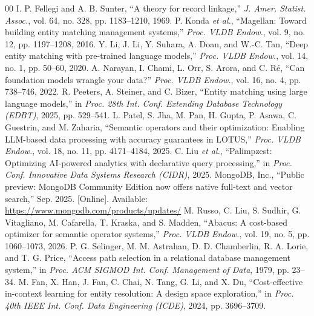 \documentclass[conference]{IEEEtran}
\begin{document}
\begin{thebibliography}{00}
 I. P. Fellegi and A. B. Sunter, ``A theory for record linkage,'' \textit{J. Amer. Statist. Assoc.}, vol. 64, no. 328, pp. 1183--1210, 1969.
 P. Konda \textit{et al.}, ``Magellan: Toward building entity matching management systems,'' \textit{Proc. VLDB Endow.}, vol. 9, no. 12, pp. 1197--1208, 2016.
 Y. Li, J. Li, Y. Suhara, A. Doan, and W.-C. Tan, ``Deep entity matching with pre-trained language models,'' \textit{Proc. VLDB Endow.}, vol. 14, no. 1, pp. 50--60, 2020.
 A. Narayan, I. Chami, L. Orr, S. Arora, and C. R\'e, ``Can foundation models wrangle your data?'' \textit{Proc. VLDB Endow.}, vol. 16, no. 4, pp. 738--746, 2022.
 R. Peeters, A. Steiner, and C. Bizer, ``Entity matching using large language models,'' in \textit{Proc. 28th Int. Conf. Extending Database Technology (EDBT)}, 2025, pp. 529--541.
 L. Patel, S. Jha, M. Pan, H. Gupta, P. Asawa, C. Guestrin, and M. Zaharia, ``Semantic operators and their optimization: Enabling LLM-based data processing with accuracy guarantees in LOTUS,'' \textit{Proc. VLDB Endow.}, vol. 18, no. 11, pp. 4171--4184, 2025.
 C. Liu \textit{et al.}, ``Palimpzest: Optimizing AI-powered analytics with declarative query processing,'' in \textit{Proc. Conf. Innovative Data Systems Research (CIDR)}, 2025.
 MongoDB, Inc., ``Public preview: MongoDB Community Edition now offers native full-text and vector search,'' Sep. 2025. [Online]. Available: \url{https://www.mongodb.com/products/updates/}
 M. Russo, C. Liu, S. Sudhir, G. Vitagliano, M. Cafarella, T. Kraska, and S. Madden, ``Abacus: A cost-based optimizer for semantic operator systems,'' \textit{Proc. VLDB Endow.}, vol. 19, no. 5, pp. 1060--1073, 2026.
 P. G. Selinger, M. M. Astrahan, D. D. Chamberlin, R. A. Lorie, and T. G. Price, ``Access path selection in a relational database management system,'' in \textit{Proc. ACM SIGMOD Int. Conf. Management of Data}, 1979, pp. 23--34.
 M. Fan, X. Han, J. Fan, C. Chai, N. Tang, G. Li, and X. Du, ``Cost-effective in-context learning for entity resolution: A design space exploration,'' in \textit{Proc. 40th IEEE Int. Conf. Data Engineering (ICDE)}, 2024, pp. 3696--3709.

\end{thebibliography}
\end{document}
